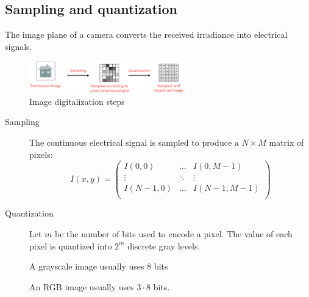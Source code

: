\subsection{Sampling and quantization}

The image plane of a camera converts the received irradiance into electrical signals.

\begin{figure}[H]
    \centering
    \includegraphics[width=0.6\textwidth]{./img/_digitalization.pdf}
    \caption{Image digitalization steps}
\end{figure}

\begin{description}
    \item[Sampling]  
        The continuous electrical signal is sampled to produce a $N \times M$ matrix of pixels:
        \[ 
            I(x, y) = \begin{pmatrix}
                I(0, 0) & \hdots & I(0, M-1) \\
                \vdots & \ddots & \vdots \\
                I(N-1, 0) & \hdots & I(N-1, M-1) \\
            \end{pmatrix}    
        \]

    \item[Quantization] 
        Let $m$ be the number of bits used to encode a pixel.
        The value of each pixel is quantized into $2^m$ discrete gray levels.
        
        \begin{remark}
            A grayscale image usually uses $8$ bits

            An RGB image usually uses $3 \cdot 8$ bits.
        \end{remark}
\end{description}

